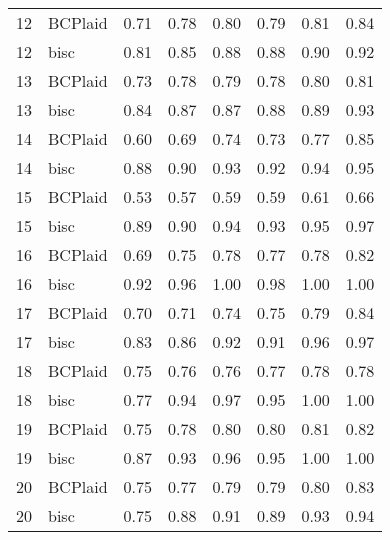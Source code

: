 \begin{table}[ht]
\begin{tabular}{rlrrrrrr}
   12 & BCPlaid & 0.71 & 0.78 & 0.80 & 0.79 & 0.81 & 0.84 \\ 
   12 & bisc & 0.81 & 0.85 & 0.88 & 0.88 & 0.90 & 0.92 \\ 
   13 & BCPlaid & 0.73 & 0.78 & 0.79 & 0.78 & 0.80 & 0.81 \\ 
   13 & bisc & 0.84 & 0.87 & 0.87 & 0.88 & 0.89 & 0.93 \\ 
   14 & BCPlaid & 0.60 & 0.69 & 0.74 & 0.73 & 0.77 & 0.85 \\ 
   14 & bisc & 0.88 & 0.90 & 0.93 & 0.92 & 0.94 & 0.95 \\ 
   15 & BCPlaid & 0.53 & 0.57 & 0.59 & 0.59 & 0.61 & 0.66 \\ 
   15 & bisc & 0.89 & 0.90 & 0.94 & 0.93 & 0.95 & 0.97 \\ 
   16 & BCPlaid & 0.69 & 0.75 & 0.78 & 0.77 & 0.78 & 0.82 \\ 
   16 & bisc & 0.92 & 0.96 & 1.00 & 0.98 & 1.00 & 1.00 \\ 
   17 & BCPlaid & 0.70 & 0.71 & 0.74 & 0.75 & 0.79 & 0.84 \\ 
   17 & bisc & 0.83 & 0.86 & 0.92 & 0.91 & 0.96 & 0.97 \\ 
   18 & BCPlaid & 0.75 & 0.76 & 0.76 & 0.77 & 0.78 & 0.78 \\ 
   18 & bisc & 0.77 & 0.94 & 0.97 & 0.95 & 1.00 & 1.00 \\ 
   19 & BCPlaid & 0.75 & 0.78 & 0.80 & 0.80 & 0.81 & 0.82 \\ 
   19 & bisc & 0.87 & 0.93 & 0.96 & 0.95 & 1.00 & 1.00 \\ 
   20 & BCPlaid & 0.75 & 0.77 & 0.79 & 0.79 & 0.80 & 0.83 \\ 
   20 & bisc & 0.75 & 0.88 & 0.91 & 0.89 & 0.93 & 0.94 \\ 
   \bottomrule
\end{tabular}
\end{table}

